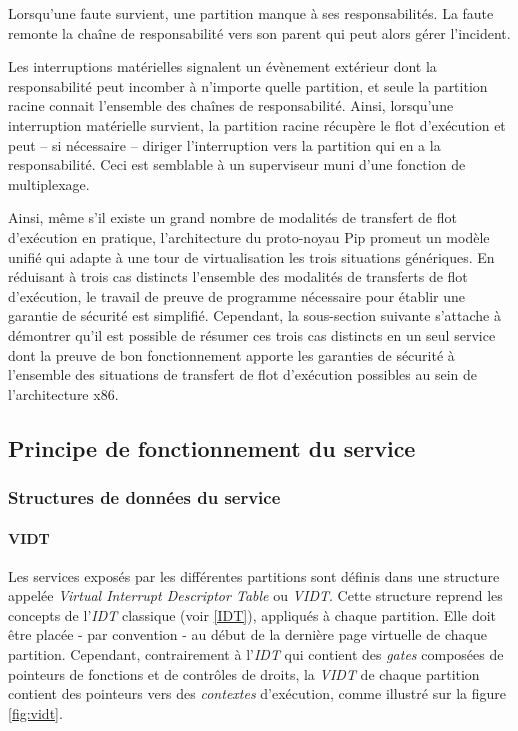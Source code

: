 	Lorsqu'une faute survient, une partition manque à ses responsabilités. La faute remonte la chaîne de responsabilité vers son parent qui peut alors gérer l'incident.

	Les interruptions matérielles signalent un évènement extérieur dont la responsabilité peut incomber à n'importe quelle partition, et seule la partition racine connait l'ensemble des chaînes de responsabilité. Ainsi, lorsqu'une interruption matérielle survient, la partition racine récupère le flot d'exécution et peut -- si nécessaire -- diriger l'interruption vers la partition qui en a la responsabilité. Ceci est semblable à un superviseur muni d'une fonction de multiplexage.

Ainsi, même s'il existe un grand nombre de modalités de transfert de flot d'exécution en pratique, l'architecture du proto-noyau Pip promeut un modèle unifié qui adapte à une tour de virtualisation les trois situations génériques. En réduisant à trois cas distincts l'ensemble des modalités de transferts de flot d'exécution, le travail de preuve de programme nécessaire pour établir une garantie de sécurité est simplifié. Cependant, la sous-section suivante s'attache à démontrer qu'il est possible de résumer ces trois cas distincts en un seul service dont la preuve de bon fonctionnement apporte les garanties de sécurité à l'ensemble des situations de transfert de flot d'exécution possibles au sein de l'architecture x86.

	\subsection{Principe de fonctionnement du service} 
	\label{service_idea}

	\subsubsection{Structures de données du service}

	\paragraph{VIDT} Les services exposés par les différentes partitions sont définis dans une structure appelée \emph{Virtual Interrupt Descriptor Table} ou \emph{VIDT}. Cette structure reprend les concepts de l'\emph{IDT} classique (voir \ref{IDT}), appliqués à chaque partition. Elle doit être placée - par convention - au début de la dernière page virtuelle de chaque partition. Cependant, contrairement à l'\emph{IDT} qui contient des \emph{gates} composées de pointeurs de fonctions et de contrôles de droits, la \emph{VIDT} de chaque partition contient des pointeurs vers des \emph{contextes} d'exécution, comme illustré sur la figure \ref{fig:vidt}.

